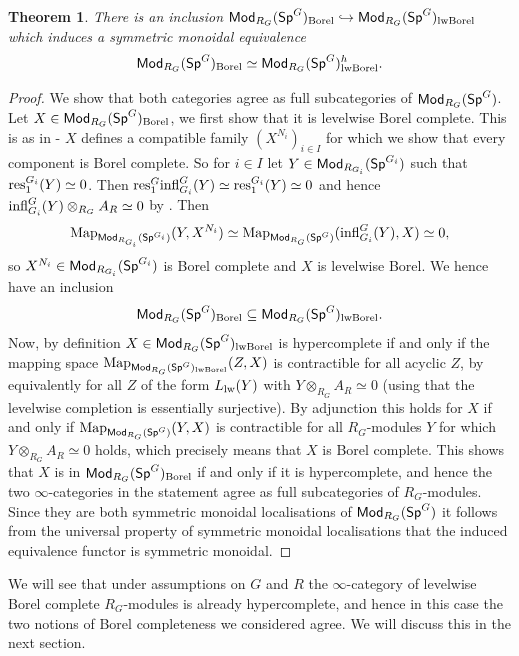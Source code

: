 \documentclass[reqno]{amsart}
\numberwithin{equation}{section}\theoremstyle{thms}
\newtheorem{thm}[equation]{Theorem}
\theoremstyle{defn}
\newcommand{\tn}[1]{\textnormal{#1}}
\newcommand{\tsf}[1]{\textsf{\textup{#1}}}
\newcommand{\Map}{\tn{Map}}
\newcommand{\Mod}{\tsf{Mod}}
\newcommand{\spec}{\tsf{Sp}}
\newcommand{\specg}{\tsf{Sp}^G}
\begin{document}
\begin{thm}\label{thm:borelandhyperlewelwise}
There is an inclusion $\Mod_{R_G}(\specg)_{\tn{Borel}} \hookrightarrow \Mod_{R_G}(\specg)_{\tn{lwBorel}}$ which induces a symmetric monoidal equivalence
$$\Mod_{R_G}(\specg)_{\tn{Borel}} \simeq \Mod_{R_G}(\specg)^h_{\tn{lwBorel}}.$$
\end{thm}
\begin{proof}
We show that both categories agree as full subcategories of $\Mod_{R_G}(\specg)$. Let $X \in \Mod_{R_G}(\specg)_{\tn{Borel}}$, we first show that it is levelwise Borel complete. This is as in  - $X$ defines a compatible family $(X^{N_i})_{i \in I}$ for which we show that every component is Borel complete. So for $i \in I$ let $Y \in \Mod_{R_{G_i}}(\spec^{G_i})$ such that $\tn{res}^{G_i}_1(Y) \simeq 0$. Then $\tn{res}^G_1\tn{infl}^G_{G_i}(Y) \simeq \tn{res}^{G_i}_1(Y) \simeq 0$ and hence $\tn{infl}^G_{G_i}(Y) \otimes_{R_G} A_R \simeq 0$ by . Then 
$$\Map_{\Mod_{R_{G_i}}(\spec^{G_i})}(Y,X^{N_i}) \simeq \Map_{\Mod_{R_{G}}(\specg)}(\tn{infl}^G_{G_i}(Y),X) \simeq 0,$$
so $X^{N_i} \in \Mod_{R_{G_i}}(\spec^{G_i})$ is Borel complete and $X$ is levelwise Borel. We hence have an inclusion 
$$\Mod_{R_G}(\specg)_{\tn{Borel}} \subseteq \Mod_{R_G}(\specg)_{\tn{lwBorel}}.$$
Now, by definition $X \in \Mod_{R_G}(\specg)_{\tn{lwBorel}}$ is hypercomplete if and only if the mapping space
$\Map_{\Mod_{R_G}(\specg)_{\tn{lwBorel}}}(Z,X)$
is contractible for all acyclic $Z$, by  equivalently for all $Z$ of the form $L_{\tn{lw}}(Y)$ with $Y \otimes_{R_G} A_R \simeq 0$ (using that the levelwise completion is essentially surjective). By adjunction this holds for $X$ if and only if
$\Map_{\Mod_{R_G}(\specg)}(Y,X)$
is contractible for all $R_G$-modules $Y$ for which $Y \otimes_{R_G} A_R \simeq 0$ holds, which precisely means that $X$ is Borel complete. This shows that $X$ is in $\Mod_{R_G}(\specg)_{\tn{Borel}}$ if and only if it is hypercomplete, and hence the two $\infty$-categories in the statement agree as full subcategories of $R_G$-modules. Since they are both symmetric monoidal localisations of $\Mod_{R_G}(\specg)$ it follows from the universal property of symmetric monoidal localisations \cite[Proposition 3.2.2]{hin16} that the induced equivalence functor is symmetric monoidal.
\end{proof}

We will see that under assumptions on $G$ and $R$ the $\infty$-category of levelwise Borel complete $R_G$-modules is already hypercomplete, and hence in this case the two notions of Borel completeness we considered agree. We will discuss this in the next section.
\end{document}
